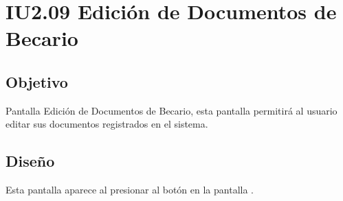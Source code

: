 \newpage
\section{IU2.09 Edición de Documentos de Becario}

\subsection{Objetivo}
	Pantalla Edición de Documentos de Becario, esta pantalla permitirá al usuario editar sus documentos registrados en el sistema.
	


\subsection{Diseño}
	Esta pantalla aparece al presionar al botón  en la pantalla  .

	
